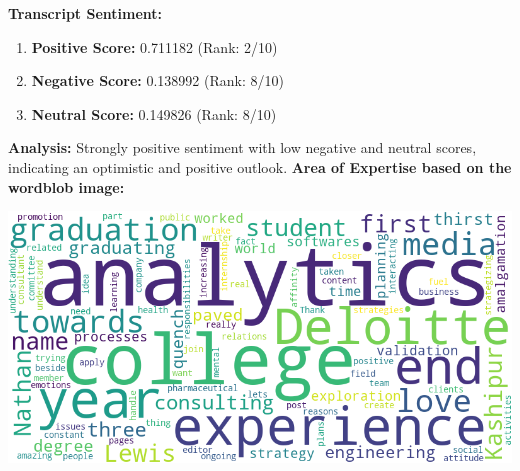 \documentclass{article}
\begin{document}
\large{\textbf{Transcript Sentiment:}}
\begin{tcolorbox}[colback=green!5!white,colframe=green!75!black,title=Sentiment Breakdown]
    \begin{enumerate}
        \item \textbf{Positive Score:} \textcolor{green!70!black}{0.711182} (Rank: 2/10)
        \item \textbf{Negative Score:} \textcolor{red!70!black}{0.138992} (Rank: 8/10)
        \item \textbf{Neutral Score:} \textcolor{blue!70!black}{0.149826} (Rank: 8/10)
    \end{enumerate}
\end{tcolorbox}
\textbf{Analysis:} Strongly positive sentiment with low negative and neutral scores, indicating an optimistic and positive outlook.
\vspace{0.3in}
\LARGE \textbf{Area of Expertise based on the wordblob image:} \normalsize
\begin{center}
    \includegraphics[width=1\columnwidth]{images/wordcloud_6.png}
\end{center}
\end{document}
